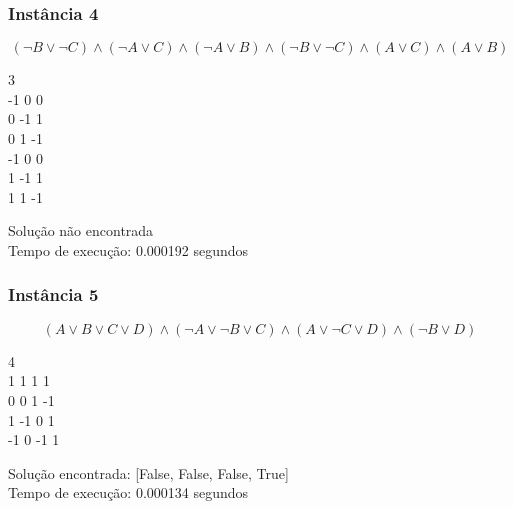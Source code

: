 \documentclass[12pt]{article}
\begin{document}
    \subsubsection{Instância 4}
    
        \[(\neg B \lor \neg C) \land (\neg A \lor C) \land (\neg A \lor B) \land (\neg B \lor \neg C) \land (A \lor C) \land (A \lor B)\]
        \begin{tcolorbox}[title=Entrada da instância 4, width=\linewidth, fontupper=\ttfamily,  halign=flush left]
            3 \\
            -1 0 0 \\
            0 -1 1 \\
            0 1 -1 \\
            -1 0 0 \\
            1 -1 1 \\
            1 1 -1 \\
        \end{tcolorbox}
        \begin{tcolorbox}[title=Saída da instância 4, width=\linewidth, fontupper=\ttfamily, halign=flush left]
            Solução não encontrada \\
            Tempo de execução: 0.000192 segundos
        \end{tcolorbox}


    \subsubsection{Instância 5}
        \[(A \lor B \lor C \lor D) \land (\neg A \lor \neg B \lor C) \land (A \lor \neg C \lor D) \land (\neg B \lor D)\]
        \begin{tcolorbox}[title=Entrada da instância 5, width=\linewidth, fontupper=\ttfamily,  halign=flush left]
            4 \\
            1 1 1 1 \\
            0 0 1 -1 \\
            1 -1 0 1 \\
            -1 0 -1 1 \\
        \end{tcolorbox}
        \begin{tcolorbox}[title=Saída da instância 5, width=\linewidth, fontupper=\ttfamily, halign=flush left]
            Solução encontrada: [False, False, False, True] \\
            Tempo de execução: 0.000134 segundos
        \end{tcolorbox}
\end{document}
